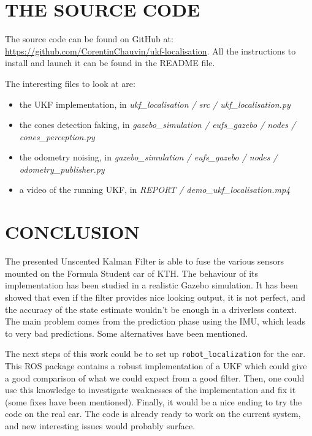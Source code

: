 \documentclass[10pt,a4paper, twocolumn]{article}
\begin{document}
\section{THE SOURCE CODE}
The source code can be found on GitHub at: \url{https://github.com/CorentinChauvin/ukf-localisation}. All the instructions to install and launch it can be found in the README file.

The interesting files to look at are:
\begin{itemize}
	\item the UKF implementation, in \textit{ukf\_localisation / src / ukf\_localisation.py}
	\item the cones detection faking, in \textit{gazebo\_simulation / eufs\_gazebo / nodes / cones\_perception.py}
	\item the odometry noising, in \textit{gazebo\_simulation / eufs\_gazebo / nodes / odometry\_publisher.py}
	\item a video of the running UKF, in \textit{REPORT / demo\_ukf\_localisation.mp4}
\end{itemize}


\section{CONCLUSION}
The presented Unscented Kalman Filter is able to fuse the various sensors mounted on the Formula Student car of KTH. The behaviour of its implementation has been studied in a realistic Gazebo simulation. It has been showed that even if the filter provides nice looking output, it is not perfect, and the accuracy of the state estimate wouldn't be enough in a driverless context. The main problem comes from the prediction phase using the IMU, which leads to very bad predictions. Some alternatives have been mentioned.

The next steps of this work could be to set up \texttt{robot\_localization} for the car. This ROS package contains a robust implementation of a UKF which could give a good comparison of what we could expect from a good filter. Then, one could use this knowledge to investigate weaknesses of the implementation and fix it (some fixes have been mentioned). Finally, it would be a nice ending to try the code on the real car. The code is already ready to work on the current system, and new interesting issues would probably surface.
\end{document}
